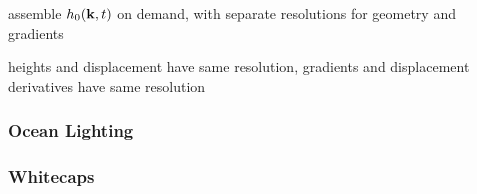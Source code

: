 assemble $h_0(\mathbf{k},t)$ on demand, with separate resolutions for geometry 
and gradients

heights and displacement have same resolution, gradients and displacement 
derivatives have same resolution

\subsubsection{Ocean Lighting}
\cite{article:oceanlighting}
\subsubsection{Whitecaps}
\cite{article:whitecaps}